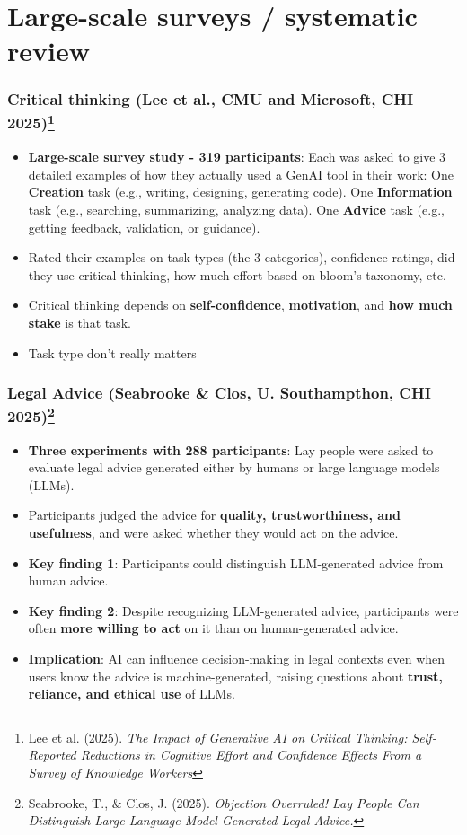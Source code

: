 \documentclass{beamer}
\begin{document}

\section{Large-scale surveys / systematic review}

\begin{frame}
    \frametitle{Critical thinking (Lee et al., CMU and Microsoft, CHI 2025)\footnote{\tiny Lee et al. (2025). \textit{The Impact of Generative AI on Critical Thinking: Self-Reported Reductions in Cognitive Effort and Confidence Effects From a Survey of Knowledge Workers}}}
    \begin{itemize}
        \item \textbf{Large-scale survey study - 319 participants}: Each was asked to give 3 detailed examples of how they actually used a GenAI tool in their work: One \textbf{Creation} task (e.g., writing, designing, generating code). One \textbf{Information} task (e.g., searching, summarizing, analyzing data). One \textbf{Advice} task (e.g., getting feedback, validation, or guidance).
        \item Rated their examples on task types (the 3 categories), confidence ratings, did they use critical thinking, how much effort based on bloom's taxonomy, etc.
        \item Critical thinking depends on \textbf{self-confidence}, \textbf{motivation}, and \textbf{how much stake} is that task.
        \item Task type don't really matters
    \end{itemize}
\end{frame}

\begin{frame}
    \frametitle{Legal Advice (Seabrooke \& Clos, U. Southampthon, CHI 2025)\footnote{\tiny Seabrooke, T., \& Clos, J. (2025). \textit{Objection Overruled! Lay People Can Distinguish Large Language Model-Generated Legal Advice.}}}
    \begin{itemize}
        \item \textbf{Three experiments with 288 participants}: Lay people were asked to evaluate legal advice generated either by humans or large language models (LLMs). 
        \item Participants judged the advice for \textbf{quality, trustworthiness, and usefulness}, and were asked whether they would act on the advice.
        \item \textbf{Key finding 1}: Participants could distinguish LLM-generated advice from human advice.
        \item \textbf{Key finding 2}: Despite recognizing LLM-generated advice, participants were often \textbf{more willing to act} on it than on human-generated advice.
        \item \textbf{Implication}: AI can influence decision-making in legal contexts even when users know the advice is machine-generated, raising questions about \textbf{trust, reliance, and ethical use} of LLMs.
    \end{itemize}
\end{frame}
\end{document}
